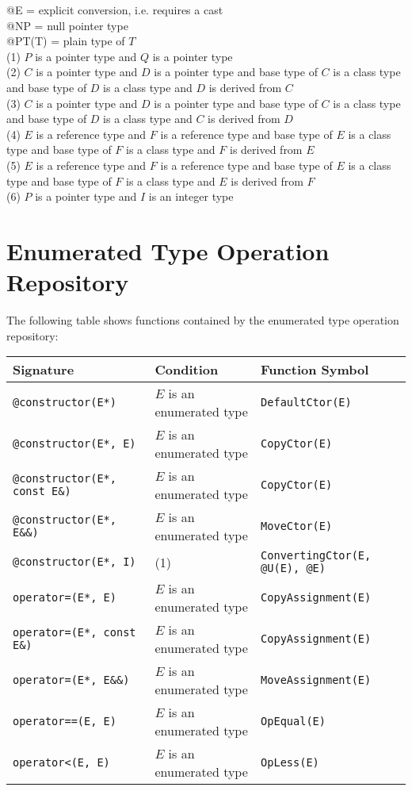 \documentclass[a4paper,oneside,11pt]{book}
\theoremstyle{definition}
\begin{document}
\begin{flushleft}
@E = explicit conversion, i.e. requires a cast\\
@NP = null pointer type\\
@PT(T) = plain type of $T$\\
(1) $P$ is a pointer type and $Q$ is a pointer type\\
(2) $C$ is a pointer type and $D$ is a pointer type and base type of $C$ is a class type
and base type of $D$ is a class type and $D$ is derived from $C$\\
(3) $C$ is a pointer type and $D$ is a pointer type and base type of $C$ is a class type
and base type of $D$ is a class type and $C$ is derived from $D$\\
(4) $E$ is a reference type and $F$ is a reference type and base type of $E$ is a class type
and base type of $F$ is a class type and $F$ is derived from $E$\\
(5) $E$ is a reference type and $F$ is a reference type and base type of $E$ is a class type
and base type of $F$ is a class type and $E$ is derived from $F$\\
(6) $P$ is a pointer type and $I$ is an integer type
\end{flushleft}

\section{Enumerated Type Operation Repository}

The following table shows functions contained by the enumerated type operation repository:

\begin{flushleft}
\begin{supertabular}{lll}
\textbf{Signature}& \textbf{Condition}& \textbf{Function Symbol}\\
\hline
\verb|@constructor(E*)|& $E$ is an enumerated type& \verb|DefaultCtor(E)|\\
\verb|@constructor(E*, E)|& $E$ is an enumerated type& \verb|CopyCtor(E)|\\
\verb|@constructor(E*, const E&)|& $E$ is an enumerated type& \verb|CopyCtor(E)|\\
\verb|@constructor(E*, E&&)|& $E$ is an enumerated type& \verb|MoveCtor(E)|\\
\verb|@constructor(E*, I)|& (1)& \verb|ConvertingCtor(E, @U(E), @E)|\\
\verb|operator=(E*, E)|& $E$ is an enumerated type& \verb|CopyAssignment(E)|\\
\verb|operator=(E*, const E&)|& $E$ is an enumerated type& \verb|CopyAssignment(E)|\\
\verb|operator=(E*, E&&)|& $E$ is an enumerated type& \verb|MoveAssignment(E)|\\
\verb|operator==(E, E)|& $E$ is an enumerated type& \verb|OpEqual(E)|\\
\verb|operator<(E, E)|& $E$ is an enumerated type& \verb|OpLess(E)|\\
\hline
\end{supertabular}
\end{flushleft}
\end{document}

